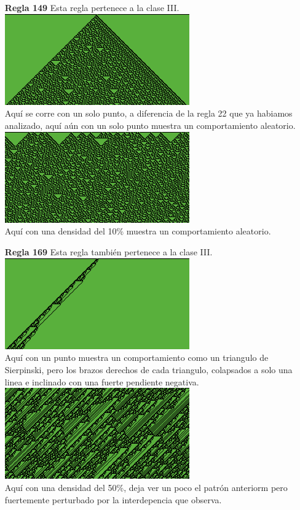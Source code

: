 \documentclass{article}
\begin{document}
\begin{enumerate}
\item[\bf{Regla 149}] Esta regla pertenece a la clase III.\\
\includegraphics[width=300px]{149-1.png}\\
Aquí se corre con un solo punto, a diferencia de la regla 22 que ya habiamos analizado, aquí aún con un solo punto muestra un comportamiento aleatorio.\\
\includegraphics[width=300px]{149-10.png}\\
Aquí con una densidad del 10\% muestra un comportamiento aleatorio.\\
\item[\bf{Regla 169}] Esta regla también pertenece a la clase III.\\
\includegraphics[width=300px]{169-1.png}\\
Aquí con un punto muestra un comportamiento como un triangulo de Sierpinski, pero los brazos derechos de cada triangulo, colapsados a solo una linea e inclinado con una fuerte pendiente negativa.\\
\includegraphics[width=300px]{169-50.png}\\
Aquí con una densidad del 50\%, deja ver un poco el patrón anteriorm pero fuertemente perturbado por la interdepencia que observa.



\end{enumerate}
\end{document}

